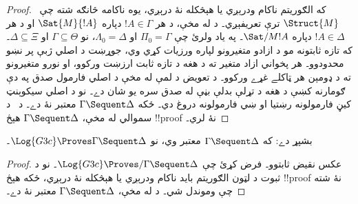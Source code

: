 \documentclass[../../../include/open-logic-section]{subfiles}
\begin{document}
\begin{proof}
  که الګوريتم ناکام ودرېږي يا هېڅکله نۀ درېږي، يوه ناکامه
  څانګه شته چې~$\Struct{M}$ ترې تعريفېږي۔ د
   له مخې، د هر $!A \in \Gamma$ دپاره
  $\Sat{M}{!A}$ او د هر $!A \in \Delta$ دپاره
  $\Sat/{M}{!A}$۔ په ياد ولرئ چې $\Pi_0 = \Gamma$ او
  $\Lambda_0 = \Delta$، نو $\Gamma \subseteq \Theta$ او
  $\Delta \subseteq \Xi$۔ که تازه ثابتونه مو د ازادو متغيرونو لپاره ورزيات کړي وي، جوړښت د اصلي ژبې پر نښو محدودوو۔ هر پخواني ازاد متغير ته د هغه د تازه ثابت ارزښت ورکوو، او نورو متغيرونو ته د ډومېن هر ټاکلے غړے ورکوو۔ د تعويض د لمې له مخې د اصلي فارمول صدق په دې ګومارنه کښې د هغه د تړلې بدلې بڼې له صدق سره يو شان دے۔ نو د اصلي سيکوېنټ کيڼ فارمولونه رښتيا او ښي فارمولونه دروغ دي۔
  ځکه $\Gamma \Sequent \Delta$ معتبر نۀ دے۔ د~ د سموالي له مخې،
  $\Gamma \Sequent \Delta$ هېڅ !!{proof} نۀ لري۔
\end{proof}

\begin{cor}
 بشپړ دے: که $\Gamma \Sequent \Delta$ معتبر وي، نو
$\Log{G3c} \Proves \Gamma \Sequent \Delta$۔
\end{cor}

\begin{proof}
  عکس نقيض ثابتوو۔ فرض کړئ چې $\Log{G3c} \Proves/ \Gamma
  \Sequent \Delta$۔ نو د ثبوت د لټون الګوريتم بايد ناکام
  ودرېږي يا هېڅکله نۀ درېږي، ځکه هېڅ !!{proof} نۀ شته چې
  وموندل شي۔ د  له مخې،
  $\Gamma \Sequent \Delta$ معتبر نۀ دے۔
\end{proof}
\end{document}
